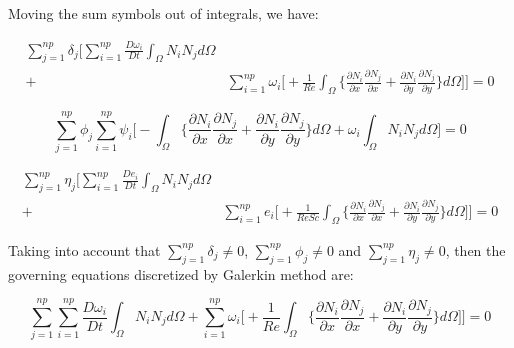 \medksip
\noindent
Moving the sum symbols out of integrals, we have:

\begin{equation}
 \begin{aligned} 
  \sum\limits_{j=1}^{np} \delta_j \Bigg[
  \sum\limits_{i=1}^{np} \frac{D \omega_i}{Dt} 
  \int_{\Omega} N_i N_j d\Omega & 
  \\[5pt]
   + & \sum\limits_{i=1}^{np} \omega_i \Bigg[
   + \frac{1}{\textit{Re}}
   \int_{\Omega} \Bigg\{ 
   \frac{\partial N_i}{\partial x} 
   \frac{\partial N_j}{\partial x} 
   + 
   \frac{\partial N_i}{\partial y} 
   \frac{\partial N_j}{\partial y} 
   \Bigg\} d\Omega
 \Bigg] \Bigg] = 0
 \end{aligned}
\end{equation}

\begin{equation}
  \sum\limits_{j=1}^{np} \phi_j
  \sum\limits_{i=1}^{np} \psi_i \Bigg[
  - \int_{\Omega} \Bigg\{ 
                  \frac{\partial N_i}{\partial x} 
                  \frac{\partial N_j}{\partial x} 
  +               \frac{\partial N_i}{\partial y} 
                  \frac{\partial N_j}{\partial y} 
  \Bigg\} d\Omega
  + \omega_i \int_{\Omega} N_i N_j d\Omega
  \Bigg] = 0
\end{equation}

\begin{equation}
 \begin{aligned} 
  \sum\limits_{j=1}^{np} \eta_j \Bigg[
  \sum\limits_{i=1}^{np} \frac{D e_i}{Dt} 
  \int_{\Omega} N_i N_j d\Omega & 
  \\[5pt]
   + & \sum\limits_{i=1}^{np} e_i \Bigg[
   + \frac{1}{\textit{ReSc}} 
   \int_{\Omega} \Bigg\{ 
   \frac{\partial N_i}{\partial x} 
   \frac{\partial N_j}{\partial x} 
   + 
   \frac{\partial N_i}{\partial y} 
   \frac{\partial N_j}{\partial y} 
   \Bigg\} d\Omega
 \Bigg] \Bigg] = 0
 \end{aligned}
\end{equation}


\noindent
Taking into account that
$\sum\limits_{j=1}^{np} \delta_j \neq 0$,
$\sum\limits_{j=1}^{np} \phi_j \neq 0$ and
$\sum\limits_{j=1}^{np} \eta_j \neq 0$,
then the governing equations discretized
by Galerkin method are:

\begin{equation} \label{vorticity galerkin}
  \sum\limits_{j=1}^{np}
  \sum\limits_{i=1}^{np} \frac{D \omega_i}{Dt} 
  \int_{\Omega} N_i N_j d\Omega 
   + \sum\limits_{i=1}^{np} \omega_i \Bigg[
   + \frac{1}{\textit{Re}}
   \int_{\Omega} \Bigg\{ 
   \frac{\partial N_i}{\partial x} 
   \frac{\partial N_j}{\partial x} 
   + 
   \frac{\partial N_i}{\partial y} 
   \frac{\partial N_j}{\partial y} 
   \Bigg\} d\Omega
 \Bigg] \Bigg] = 0
\end{equation}

